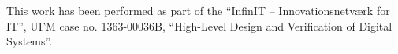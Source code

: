 \documentclass[conference]{IEEEtran}
\begin{document}
This work has been performed as part of the
``InfinIT -- Innovationsnetv{\ae}rk for IT'', UFM case no. 1363-00036B,
``High-Level Design and Verification of Digital Systems''.







\end{document}
